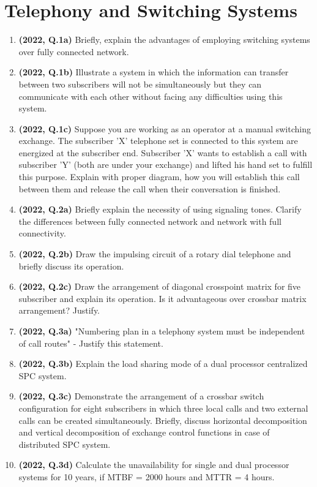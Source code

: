 \documentclass[12pt, a4paper]{article}
\begin{document}
	\section{Telephony and Switching Systems}
	\begin{enumerate}
		\item \textbf{(2022, Q.1a)} Briefly, explain the advantages of employing switching systems over fully connected network.
		\item \textbf{(2022, Q.1b)} Illustrate a system in which the information can transfer between two subscribers will not be simultaneously but they can communicate with each other without facing any difficulties using this system.
		\item \textbf{(2022, Q.1c)} Suppose you are working as an operator at a manual switching exchange. The subscriber 'X' telephone set is connected to this system are energized at the subscriber end. Subscriber 'X' wants to establish a call with subscriber 'Y' (both are under your exchange) and lifted his hand set to fulfill this purpose. Explain with proper diagram, how you will establish this call between them and release the call when their conversation is finished.
		\item \textbf{(2022, Q.2a)} Briefly explain the necessity of using signaling tones. Clarify the differences between fully connected network and network with full connectivity.
		\item \textbf{(2022, Q.2b)} Draw the impulsing circuit of a rotary dial telephone and briefly discuss its operation.
		\item \textbf{(2022, Q.2c)} Draw the arrangement of diagonal crosspoint matrix for five subscriber and explain its operation. Is it advantageous over crossbar matrix arrangement? Justify.
		\item \textbf{(2022, Q.3a)} "Numbering plan in a telephony system must be independent of call routes" - Justify this statement.
		\item \textbf{(2022, Q.3b)} Explain the load sharing mode of a dual processor centralized SPC system.
		\item \textbf{(2022, Q.3c)} Demonstrate the arrangement of a crossbar switch configuration for eight subscribers in which three local calls and two external calls can be created simultaneously. Briefly, discuss horizontal decomposition and vertical decomposition of exchange control functions in case of distributed SPC system.
		\item \textbf{(2022, Q.3d)} Calculate the unavailability for single and dual processor systems for 10 years, if MTBF = 2000 hours and MTTR = 4 hours.

\end{enumerate}
\end{document}
